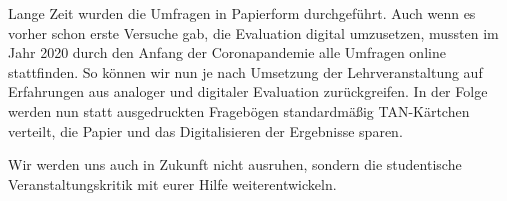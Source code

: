 \begin{multicols}{2}
Lange Zeit wurden die Umfragen in Papierform durchgeführt. Auch wenn es vorher schon erste Versuche gab, die Evaluation digital umzusetzen, mussten im Jahr 2020 durch den Anfang der Coronapandemie alle Umfragen online stattfinden. So können wir nun je nach Umsetzung der Lehrveranstaltung auf Erfahrungen aus analoger und digitaler Evaluation zurückgreifen. In der Folge werden nun statt ausgedruckten Fragebögen standardmäßig TAN-Kärtchen verteilt, die Papier und das Digitalisieren der Ergebnisse sparen.

Wir werden uns auch in Zukunft nicht ausruhen, sondern die studentische Veranstaltungskritik mit eurer Hilfe weiterentwickeln.

\end{multicols}
